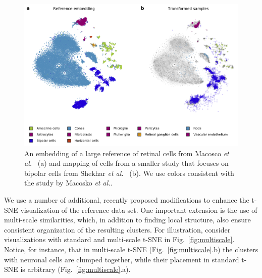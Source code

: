 \documentclass[runningheads]{llncs}
\newcommand{\etal}{\textit{et al.}}
\begin{document}
\begin{figure}[htb]
  \includegraphics[width=\textwidth]{figures/transform_retina.pdf}
  \caption{An embedding of a large reference of retinal cells from Macosco
  \etal~\cite{macosko2015} (a) and mapping of cells from a smaller study that
  focuses on bipolar cells from Shekhar \etal~\cite{shekhar2016} (b). We use
  colors consistent with the study by Macosko \etal.}
  \label{fig:transform_retina}
\end{figure}

We use a number of additional, recently proposed modifications to enhance the t-SNE visualization of the reference data set.
One important extension is the use of multi-scale similarities, which, in addition to finding local structure, also ensure consistent organization of the resulting clusters.
For illustration, consider visualizations with standard
and multi-scale t-SNE in Fig.~\ref{fig:multiscale}. Notice, for instance, that
in multi-scale t-SNE (Fig.~\ref{fig:multiscale}.b) the clusters with neuronal
cells are clumped together, while their placement in standard t-SNE is
arbitrary (Fig.~\ref{fig:multiscale}.a).
\end{document}
